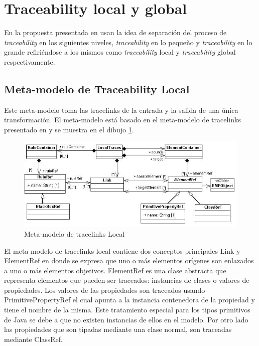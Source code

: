 \documentclass[a4paper,12pt,oneside,spanish]{book}
\begin{document}
\section{Traceability local y global}

En la propuesta presentada en \cite{GlitiaEtienDumoulin} usan la idea de separación del proceso de \textit{traceability} en los siguientes niveles, \textit{traceability} en lo pequeño y \textit{traceability} en lo grande refiriéndose a los mismos como \textit{traceability} local y \textit{traceability} global respectivamente.

\subsection{Meta-modelo de Traceability Local}

Este meta-modelo toma las tracelinks de la entrada y la salida de una única transformación. El meta-modelo está basado en el meta-modelo de tracelinks presentado en \cite{Jouault} y se muestra en el dibujo \ref{fig:LocalTraceMetamodel}.

\begin{figure}[hbtp]
\centering
\includegraphics[scale=.55]{./img/LocalTraceMetamodel}
\caption{Meta-modelo de tracelinks Local}
\label{fig:LocalTraceMetamodel}
\end{figure}

El meta-modelo de tracelinks local contiene dos conceptos principales Link y ElementRef en donde se expresa que uno o más elementos orígenes son enlazados a uno o más elementos objetivos. ElementRef es una clase abstracta que representa elementos que pueden ser traceados: instancias de clases o valores de propiedades. Los valores de las propiedades son traceados usando PrimitivePropertyRef el cual apunta a la instancia contenedora de la propiedad y tiene el nombre de la misma. Este tratamiento especial para los tipos primitivos de Java se debe a que no existen instancias de ellos en el modelo. Por otro lado las propiedades que son tipadas mediante una clase normal, son traceadas mediante ClassRef.
\end{document}
